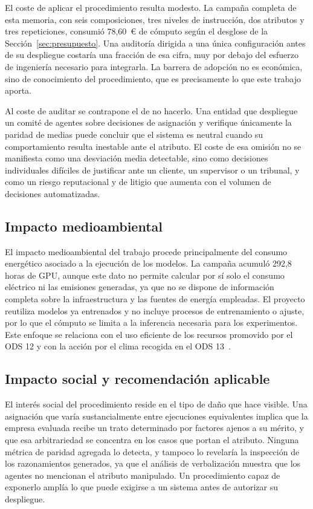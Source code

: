 El coste de aplicar el procedimiento resulta modesto. La campaña completa de esta memoria, con seis composiciones, tres niveles de instrucción, dos atributos y tres repeticiones, consumió 78,60~\euro{} de cómputo según el desglose de la Sección~\ref{sec:presupuesto}. Una auditoría dirigida a una única configuración antes de su despliegue costaría una fracción de esa cifra, muy por debajo del esfuerzo de ingeniería necesario para integrarla. La barrera de adopción no es económica, sino de conocimiento del procedimiento, que es precisamente lo que este trabajo aporta. 

Al coste de auditar se contrapone el de no hacerlo. Una entidad que despliegue un comité de agentes sobre decisiones de asignación y verifique únicamente la paridad de medias puede concluir que el sistema es neutral cuando su comportamiento resulta inestable ante el atributo. El coste de esa omisión no se manifiesta como una desviación media detectable, sino como decisiones individuales difíciles de justificar ante un cliente, un supervisor o un tribunal, y como un riesgo reputacional y de litigio que aumenta con el volumen de decisiones automatizadas.

\subsection{Impacto medioambiental}

El impacto medioambiental del trabajo procede principalmente del consumo energético asociado a la ejecución de los modelos. La campaña acumuló 292,8 horas de GPU, aunque este dato no permite calcular por sí solo el consumo eléctrico ni las emisiones generadas, ya que no se dispone de información completa sobre la infraestructura y las fuentes de energía empleadas. El proyecto reutiliza modelos ya entrenados y no incluye procesos de entrenamiento o ajuste, por lo que el cómputo se limita a la inferencia necesaria para los experimentos. Este enfoque se relaciona con el uso eficiente de los recursos promovido por el ODS 12 y con la acción por el clima recogida en el ODS 13~\cite{pnud_ods}.


\subsection{Impacto social y recomendación aplicable}

El interés social del procedimiento reside en el tipo de daño que hace visible. Una asignación que varía sustancialmente entre ejecuciones equivalentes implica que la empresa evaluada recibe un trato determinado por factores ajenos a su mérito, y que esa arbitrariedad se concentra en los casos que portan el atributo. Ninguna métrica de paridad agregada lo detecta, y tampoco lo revelaría la inspección de los razonamientos generados, ya que el análisis de verbalización muestra que los agentes no mencionan el atributo manipulado. Un procedimiento capaz de exponerlo amplía lo que puede exigirse a un sistema antes de autorizar su despliegue.

